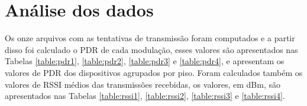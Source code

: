 \section{Análise dos dados}


Os onze arquivos com as tentativas de transmissão foram computados e a partir disso foi calculado o PDR de cada modulação, esses valores são apresentados nas Tabelas \ref{table:pdr1}, \ref{table:pdr2}, \ref{table:pdr3} e \ref{table:pdr4}, e apresentam os valores de PDR dos dispositivos agrupados por piso. Foram calculados também os valores de RSSI médios das transmissões recebidas, os valores, em dBm, são apresentados nas Tabelas \ref{table:rssi1}, \ref{table:rssi2}, \ref{table:rssi3} e \ref{table:rssi4}.

